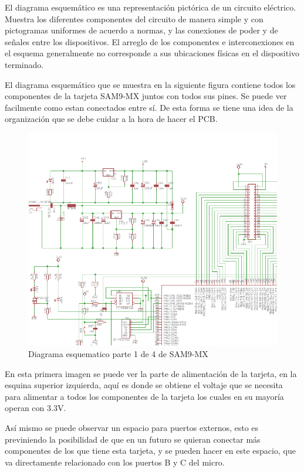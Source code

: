 El diagrama esquem\'atico es una representaci\'on pict\'orica de un circuito el\'ectrico. Muestra los diferentes componentes del circuito de manera simple y con pictogramas uniformes de acuerdo a normas, y las conexiones de poder y de señales entre los dispositivos. El arreglo de los componentes e interconexiones en el esquema generalmente no corresponde a sus ubicaciones f\'isicas en el dispositivo terminado.\medskip

El diagrama esquem\'atico que se muestra en la siguiente figura contiene todos los componentes de la tarjeta SAM9-MX juntos con todos sus pines. Se puede ver facilmente como estan conectados entre s\'i. De esta forma se tiene una idea de la organizaci\'on que se debe cuidar a la hora de hacer el PCB.\medskip

\begin{figure}[H]
\includegraphics[scale=0.55]{samEsq1}
\caption{Diagrama esquematico parte 1 de 4 de SAM9-MX}\label{fig:samEsq1}
\end{figure}

En esta primera imagen se puede ver la parte de alimentaci\'on de la tarjeta, en la esquina superior izquierda, aqu\'i es donde se obtiene el voltaje que se necesita para alimentar a todos los componentes de la tarjeta los cuales en su mayor\'ia operan con 3.3V.\medskip

As\'i mismo se puede observar un espacio para puertos externos, esto es previniendo la posibilidad de que en un futuro se quieran conectar m\'as componentes de los que tiene esta tarjeta, y se pueden hacer en este espacio, que va directamente relacionado con los puertos B y C del micro.\medskip

